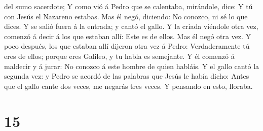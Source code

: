 del sumo sacerdote;  Y como vió á Pedro que se calentaba,
mirándole, dice: Y tú con Jesús el Nazareno estabas.  Mas
él negó, diciendo: No conozco, ni sé lo que dices. Y se salió fuera á la
entrada; y cantó el gallo.  Y la criada viéndole otra vez,
comenzó á decir á los que estaban allí: Este es de ellos. 
Mas él negó otra vez. Y poco después, los que estaban allí dijeron otra
vez á Pedro: Verdaderamente tú eres de ellos; porque eres Galileo, y tu
habla es semejante.  Y él comenzó á maldecir y á jurar: No
conozco á este hombre de quien habláis.  Y el gallo cantó
la segunda vez: y Pedro se acordó de las palabras que Jesús le había
dicho: Antes que el gallo cante dos veces, me negarás tres veces. Y
pensando en esto, lloraba.

\hypertarget{section-14}{%
\section{15}\label{section-14}}

